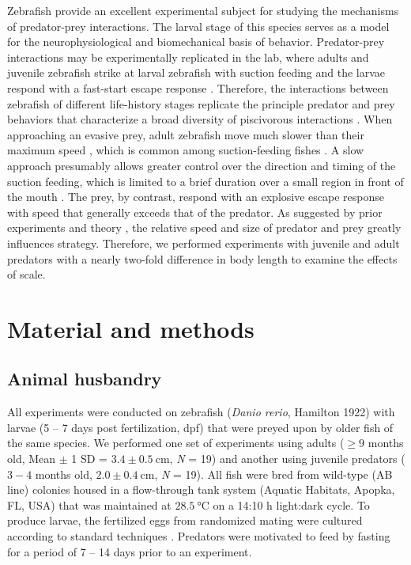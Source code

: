 \documentclass[]{rsos}%
\begin{document}
Zebrafish provide an excellent experimental subject for studying the mechanisms of predator-prey interactions. 
The larval stage of this species serves as a model for the neurophysiological \cite{Bianco:2015gm,Bagnall:2014iu,Huang:2013vj} and biomechanical \cite{Muller:2004hp,Li:2016cy} basis of behavior.
Predator-prey interactions may be experimentally replicated in the lab, where adults and juvenile zebrafish strike at larval zebrafish with suction feeding and the larvae respond with a fast-start escape response \cite{Stewart:2013bha}.
Therefore, the interactions between zebrafish of different life-history stages replicate the principle predator and prey behaviors that characterize a broad diversity of piscivorous interactions \cite{Weihs:1984tb,Walker:2005vn}. 
When approaching an evasive prey, adult zebrafish move much slower than their maximum speed \cite{Stewart:2013bha}, which is common among suction-feeding fishes \cite{Webb:1984jz,Higham:2007go}.
A slow approach presumably allows greater control over the direction and timing of the suction feeding, which is limited to a brief duration over a small region in front of the mouth \cite{Holzman:2008jc,Holzman:2009uu}. 
The prey, by contrast, respond with an explosive escape response with speed that generally exceeds that of the predator. 
As suggested by prior experiments \cite{Fuiman:1994td} and theory \cite{Weihs:1984tb}, the relative speed and size of predator and prey greatly influences strategy.
Therefore, we performed experiments with juvenile and adult predators with a nearly two-fold difference in body length to examine the effects of scale.


\section{Material and methods}

\subsection{Animal husbandry}
All experiments were conducted on zebrafish (\textit{Danio rerio}, Hamilton 1922) with larvae (5 -- 7 days post fertilization, dpf) that were preyed upon by older fish of the same species. 
We performed one set of experiments using adults ($\geq 9$ months old, Mean $\pm$ 1 SD = $3.4 \pm \SI{0.5}{\cm}$, \textit{N} = 19) and another using juvenile predators ($3-4$ months old, $2.0  \pm  \SI{0.4}{\cm}$, \textit{N} = 19).
All fish were bred from wild-type (AB line) colonies housed in a flow-through tank system (Aquatic Habitats, Apopka, FL, USA) that was maintained at $\SI{28.5}{\celsius}$ on a 14:10 h light:dark cycle. 
To produce larvae, the fertilized eggs from randomized mating were cultured according to standard techniques \cite{Westerfield:UXiBrEuA}.
Predators were motivated to feed by fasting for a period of 7 -- 14 days prior to an experiment.
\end{document}

